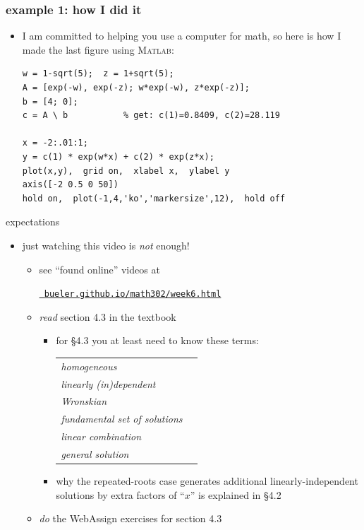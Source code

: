 \documentclass{beamer}
\newcommand{\Matlab}{\textsc{Matlab}}
\begin{document}
\begin{frame}[fragile]
\frametitle{example 1: how I did it}

\begin{itemize}
\item I am committed to helping you use a computer for math, so here is how I made the last figure using \Matlab:

\bigskip
\begin{Verbatim}[fontsize=\small]
w = 1-sqrt(5);  z = 1+sqrt(5);
A = [exp(-w), exp(-z); w*exp(-w), z*exp(-z)];
b = [4; 0];
c = A \ b           % get: c(1)=0.8409, c(2)=28.119

x = -2:.01:1;
y = c(1) * exp(w*x) + c(2) * exp(z*x); 
plot(x,y),  grid on,  xlabel x,  ylabel y
axis([-2 0.5 0 50])
hold on,  plot(-1,4,'ko','markersize',12),  hold off
\end{Verbatim}
\end{itemize}
\end{frame}




\begin{frame}{expectations}

\begin{itemize}
\item just watching this video is \emph{not} enough!
     \begin{itemize}
     \item see ``found online'' videos at

     \centerline{\href{https://bueler.github.io/math302/week6.html}{\tt \color{cyan} bueler.github.io/math302/week6.html}}
     \item \emph{read} section 4.3 in the textbook
         \begin{itemize}
         \item for \S4.3 you at least need to know these terms:

\medskip
             \begin{tabular}{ll}
             \emph{homogeneous} \\
             \emph{linearly (in)dependent} \\
             \emph{Wronskian} \\
             \emph{fundamental set of solutions} \\
             \emph{linear combination} \\
             \emph{general solution}
             \end{tabular}

\bigskip
         \item why the repeated-roots case generates additional linearly-independent solutions by extra factors of ``$x$'' is explained in \S4.2
         \end{itemize}
     \item \emph{do} the WebAssign exercises for section 4.3
     \end{itemize}
\end{itemize}
\end{frame}
\end{document}
